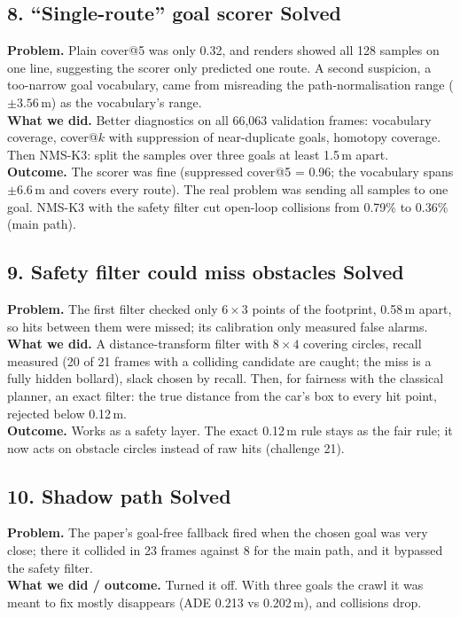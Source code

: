 \documentclass[11pt,a4paper]{article}
\newcommand{\solved}{\textcolor{okc}{\textbf{Solved}}}
\begin{document}
\subsection*{8. ``Single-route'' goal scorer \hfill\solved}
\textbf{Problem.} Plain cover@5 was only 0.32, and renders showed all 128 samples on one line, suggesting the
scorer only predicted one route. A second suspicion, a too-narrow goal vocabulary, came from misreading the
path-normalisation range ($\pm3.56$\,m) as the vocabulary's range.\\
\textbf{What we did.} Better diagnostics on all 66{,}063 validation frames: vocabulary coverage, cover@$k$ with
suppression of near-duplicate goals, homotopy coverage. Then NMS-K3: split the samples over three goals at
least 1.5\,m apart.\\
\textbf{Outcome.} The scorer was fine (suppressed cover@5 = 0.96; the vocabulary spans $\pm6.6$\,m and covers
every route). The real problem was sending all samples to one goal. NMS-K3 with the safety filter cut
open-loop collisions from 0.79\% to 0.36\% (main path).

\subsection*{9. Safety filter could miss obstacles \hfill\solved}
\textbf{Problem.} The first filter checked only $6\times3$ points of the footprint, 0.58\,m apart, so hits between
them were missed; its calibration only measured false alarms.\\
\textbf{What we did.} A distance-transform filter with $8\times4$ covering circles, recall measured (20 of 21
frames with a colliding candidate are caught; the miss is a fully hidden bollard), slack chosen by recall.
Then, for fairness with the classical planner, an exact filter: the true distance from the car's box to every
hit point, rejected below 0.12\,m.\\
\textbf{Outcome.} Works as a safety layer. The exact 0.12\,m rule stays as the fair rule; it now acts on obstacle
circles instead of raw hits (challenge 21).

\subsection*{10. Shadow path \hfill\solved}
\textbf{Problem.} The paper's goal-free fallback fired when the chosen goal was very close; there it collided in
23 frames against 8 for the main path, and it bypassed the safety filter.\\
\textbf{What we did / outcome.} Turned it off. With three goals the crawl it was meant to fix mostly disappears
(ADE 0.213 vs 0.202\,m), and collisions drop.
\end{document}
